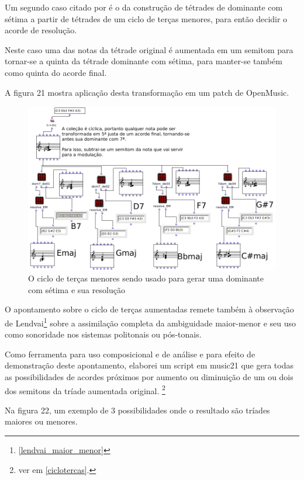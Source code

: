 \documentclass[
	12pt,				%
	openright,			%
	twoside,			%
	a4paper,			%
	english,			%
	french,				%
	spanish,			%
	brazil				%
	]{abntex2}
\begin{document}
Um segundo caso citado por  é o da construção de tétrades de dominante com sétima a partir de tétrades de um ciclo de terças menores, para então decidir o acorde de resolução. 

Neste caso uma das notas da tétrade original é aumentada em um semitom para tornar-se a quinta da tétrade dominante com sétima, para manter-se também como quinta do acorde final.


A figura 21 mostra aplicação desta transformação em um patch de OpenMusic.


\begin{figure}[!h]
	\caption{\label{fig_grafico}O ciclo de terças menores sendo usado para gerar uma dominante com sétima e sua resolução   }
	\begin{center}
	    \includegraphics[scale=0.5]{ciclos/setimadominante.png}
	\end{center}
\end{figure}

O apontamento sobre o ciclo de terças aumentadas remete também à observação de Lendvai\footnote{ \autoref{lendvai_maior_menor} } sobre a assimilação completa da ambiguidade maior-menor e seu uso como sonoridade nos sistemas politonais ou pós-tonais. 

Como ferramenta para uso composicional e de análise e para efeito de demonstração deste apontamento, elaborei um script em music21 que gera todas as possibilidades de acordes próximos por aumento ou diminuição de um ou dois dos semitons da tríade aumentada original. \footnote{ver em \autoref{ciclotercas}.}

Na figura 22, um exemplo de 3 possibilidades onde o resultado são tríades maiores ou menores.
\end{document}
